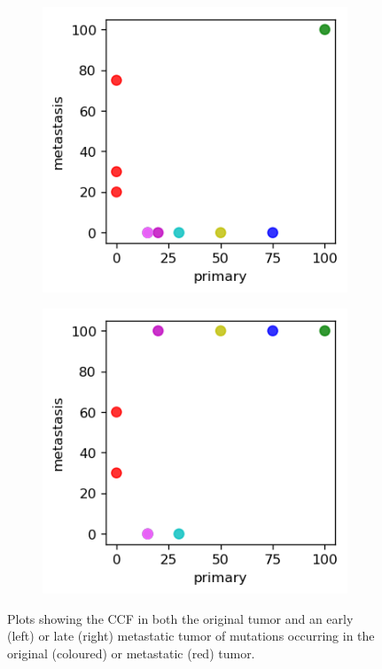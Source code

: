 \documentclass{article}
\begin{document}
\begin{figure}[h]
	\centering
	\begin{subfigure}[t]{0.30\linewidth}
		\centering
		\includegraphics[width = 1.0\linewidth, trim={0 0 0 0}, clip=true]{meta_early.png}
		\label{fig:early}	
	\end{subfigure}%
	\hspace{0.12 \linewidth}
	\begin{subfigure}[t]{0.30\linewidth}
		\centering
		\includegraphics[width = 1.0\linewidth, trim={0 0 0 0}, clip=true]{meta_late.png}
		\label{fig:late}
	\end{subfigure}%
\caption{Plots showing the CCF in both the original tumor and an early (left) or late (right) metastatic tumor of mutations occurring in the original (coloured) or metastatic (red) tumor.}
\label{fig:metastases}
\end{figure}
\end{document}
